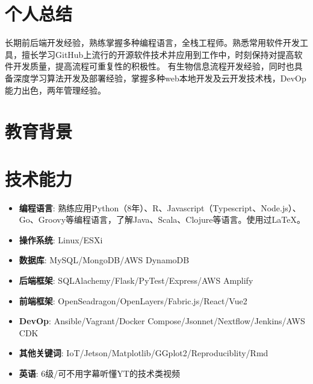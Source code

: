 \documentclass{resume}
\begin{document}


 
\section{个人总结}
长期前后端开发经验，熟练掌握多种编程语言，全栈工程师。熟悉常用软件开发工具，擅长学习GitHub上流行的开源软件技术并应用到工作中，时刻保持对提高软件开发质量，提高流程可重复性的积极性。
有生物信息流程开发经验，同时也具备深度学习算法开发及部署经验，掌握多种web本地开发及云开发技术栈，DevOp能力出色，两年管理经验。

\section{教育背景}

\section{技术能力}
\begin{itemize}[parsep=0.2ex]
  \item \textbf{编程语言}: 熟练应用Python（8年）、R、Javascript（Typescript、Node.js）、Go、Groovy等编程语言，了解Java、Scala、Clojure等语言。使用过\LaTeX{}。
  \item \textbf{操作系统}: Linux/ESXi
  \item \textbf{数据库}: MySQL/MongoDB/AWS DynamoDB
  \item \textbf{后端框架}: SQLAlachemy/Flask/PyTest/Express/AWS Amplify
  \item \textbf{前端框架}: OpenSeadragon/OpenLayers/Fabric.js/React/Vue2
  \item \textbf{DevOp}: Ansible/Vagrant/Docker Compose/Jsonnet/Nextflow/Jenkins/AWS CDK
  \item \textbf{其他关键词}: IoT/Jetson/Matplotlib/GGplot2/Reproduciblity/Rmd
  \item \textbf{英语}: 6级/可不用字幕听懂YT的技术类视频
\end{itemize}
\end{document}
